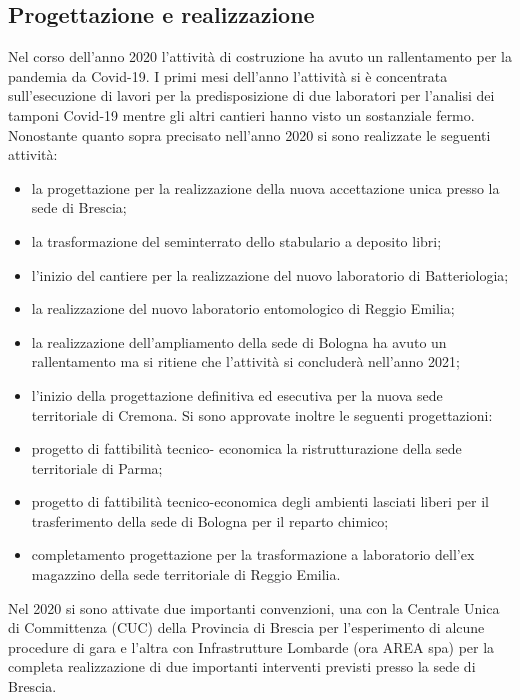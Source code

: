 \documentclass[
  12pt,
]{article}
\providecommand{\tightlist}{%
  \setlength{\itemsep}{0pt}\setlength{\parskip}{0pt}}
\begin{document}
\hypertarget{progettazione-e-realizzazione}{%
\subsection{Progettazione e
realizzazione}\label{progettazione-e-realizzazione}}

Nel corso dell'anno 2020 l'attività di costruzione ha avuto un
rallentamento per la pandemia da Covid-19. I primi mesi dell'anno
l'attività si è concentrata sull'esecuzione di lavori per la
predisposizione di due laboratori per l'analisi dei tamponi Covid-19
mentre gli altri cantieri hanno visto un sostanziale fermo. Nonostante
quanto sopra precisato nell'anno 2020 si sono realizzate le seguenti
attività:

\begin{itemize}
\tightlist
\item
  la progettazione per la realizzazione della nuova accettazione unica
  presso la sede di Brescia;
\item
  la trasformazione del seminterrato dello stabulario a deposito libri;
\item
  l'inizio del cantiere per la realizzazione del nuovo laboratorio di
  Batteriologia;
\item
  la realizzazione del nuovo laboratorio entomologico di Reggio Emilia;
\item
  la realizzazione dell'ampliamento della sede di Bologna ha avuto un
  rallentamento ma si ritiene che l'attività si concluderà nell'anno
  2021;
\item
  l'inizio della progettazione definitiva ed esecutiva per la nuova sede
  territoriale di Cremona. Si sono approvate inoltre le seguenti
  progettazioni:
\item
  progetto di fattibilità tecnico- economica la ristrutturazione della
  sede territoriale di Parma;
\item
  progetto di fattibilità tecnico-economica degli ambienti lasciati
  liberi per il trasferimento della sede di Bologna per il reparto
  chimico;
\item
  completamento progettazione per la trasformazione a laboratorio
  dell'ex magazzino della sede territoriale di Reggio Emilia.
\end{itemize}

Nel 2020 si sono attivate due importanti convenzioni, una con la
Centrale Unica di Committenza (CUC) della Provincia di Brescia per
l'esperimento di alcune procedure di gara e l'altra con Infrastrutture
Lombarde (ora AREA spa) per la completa realizzazione di due importanti
interventi previsti presso la sede di Brescia.
\end{document}
